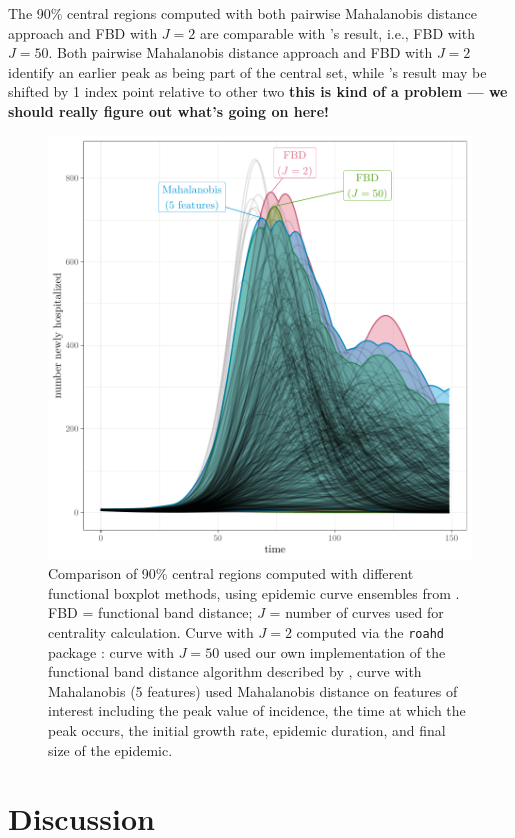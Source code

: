 \documentclass[fleqn,10pt,lineno]{wlpeerj}
\begin{document}
The 90\% central regions computed with both pairwise Mahalanobis distance approach and FBD with $J=2$ are comparable with \juul's result, i.e., FBD with $J=50$. Both pairwise Mahalanobis distance approach and FBD with $J=2$ identify an earlier peak as being part of the central set, while \juul's result may be shifted by 1 index point relative to other two \textbf{this is kind of a problem --- we should really figure out what's going on here!}

\begin{figure}[ht]\centering
  \includegraphics[width=\linewidth]{scripts/cent_plot.pdf}
  \caption{Comparison of 90\% central regions computed with
    different functional boxplot methods, using epidemic curve ensembles from \juul. FBD = functional band distance; $J$ = number of curves used for centrality calculation. Curve with $J=2$ computed via the \texttt{roahd} package \citep{roahd}: curve with $J=50$ used our own implementation of the functional band distance algorithm described by \juul, curve with Mahalanobis (5 features) used Mahalanobis distance on features of interest including the peak value of incidence, the time at which the peak occurs, the initial growth rate, epidemic duration, and final size of the epidemic.
  }
  \label{p.a}
\end{figure}
 
\section*{Discussion}
\end{document}
